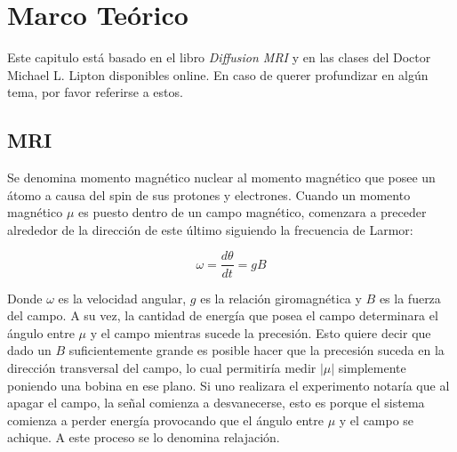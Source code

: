 \chapter{Marco Te\'orico}

Este capitulo est\'a basado en el libro \textit{Diffusion MRI} \cite{Basser2009}
y en las clases del Doctor Michael L. Lipton \cite{Lipton2014} disponibles online. 
En caso de querer profundizar en alg\'un tema, por favor referirse a estos. 

\section{MRI}
Se denomina momento magn\'etico nuclear al momento magn\'etico que posee un 
\'atomo a causa del spin de sus protones y electrones. Cuando un momento 
magn\'etico $\mu$ es puesto dentro de un campo magn\'etico, comenzara a preceder 
alrededor de la direcci\'on de este \'ultimo siguiendo la frecuencia de Larmor: 

$$ \omega = \frac{d\theta}{dt} = gB $$

Donde $\omega$ es la velocidad angular, $g$ es la relaci\'on giromagn\'etica y 
$B$ es la fuerza del campo. A su vez, la cantidad de energ\'ia que posea el campo
determinara el \'angulo entre $\mu$ y el campo mientras sucede la precesi\'on. 
Esto quiere decir que dado un $B$ suficientemente grande es posible hacer que 
la precesi\'on suceda en la direcci\'on transversal del campo, lo cual permitir\'ia
medir $|\mu|$ simplemente poniendo una bobina en ese plano. Si uno realizara
el experimento notar\'ia que al apagar el campo, la se\~nal comienza a desvanecerse,
esto es porque el sistema comienza a perder energ\'ia provocando que el \'angulo
entre $\mu$ y el campo se achique. A este proceso se lo denomina relajaci\'on. \\

